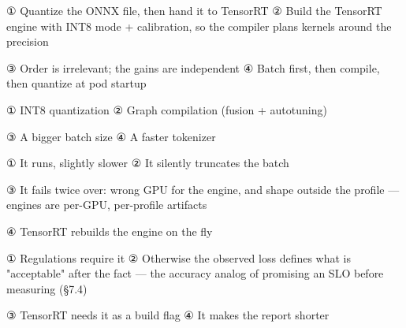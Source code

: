 
\begin{tbboptions}
  \item ① Quantize the ONNX file, then hand it to TensorRT        ② Build the TensorRT engine with INT8 mode + calibration, so the compiler plans kernels around the precision
  \item ③ Order is irrelevant; the gains are independent        ④ Batch first, then compile, then quantize at pod startup
\end{tbboptions}


\begin{tbboptions}
  \item ① INT8 quantization        ② Graph compilation (fusion + autotuning)
  \item ③ A bigger batch size        ④ A faster tokenizer
\end{tbboptions}


\begin{tbboptions}
  \item ① It runs, slightly slower        ② It silently truncates the batch
  \item ③ It fails twice over: wrong GPU for the engine, and shape outside the profile — engines are per-GPU, per-profile artifacts
  \item ④ TensorRT rebuilds the engine on the fly
\end{tbboptions}


\begin{tbboptions}
  \item ① Regulations require it        ② Otherwise the observed loss defines what is "acceptable" after the fact — the accuracy analog of promising an SLO before measuring (§7.4)
  \item ③ TensorRT needs it as a build flag        ④ It makes the report shorter
\end{tbboptions}


